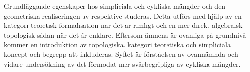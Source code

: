 \documentclass[../../main.tex]{subfiles}
\begin{document}
    Grundläggande egenskaper hos simpliciala och cykliska mängder och den geometriska realiseringen av respektive studeras. Detta utförs med hjälp av en kategori teoretisk formalisation när det är rimligt och en mer direkt algebraisk topologisk sådan när det är enklare. Eftersom ämnena är ovanliga på grundnivå kommer en introduktion av topologiska, kategori teoretiska och simpliciala koncept och begrepp att inkluderas. Syftet är förståelsen av ovannämnda och vidare undersökning av det förmodat mer svårbegripliga av cykliska mängder.
\end{document}
